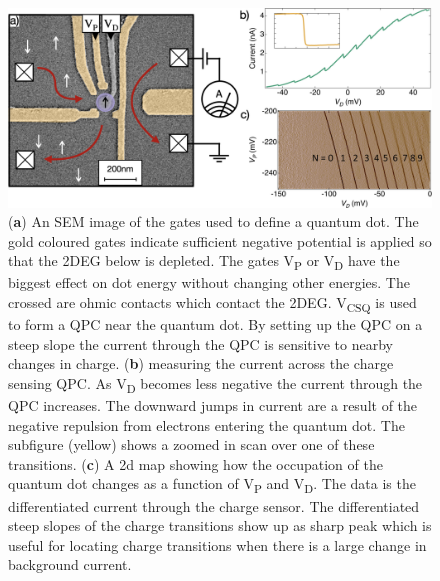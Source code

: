 \begin{figure}[ht]
  \begin{center}
    \includegraphics[width=1.0\textwidth]{figures/ch1/crop_PosterFiguresMaster.004.png}
    \caption[Charge sensing a quantum dot]{\label{fig:ch1/ct_intro} 
    (\textbf{a}) An SEM image of the gates used to define a quantum dot. The gold coloured gates indicate sufficient negative potential is applied so that the 2DEG below is depleted. The gates V\textsubscript{P} or V\textsubscript{D} have the biggest effect on dot energy without changing other energies. The crossed are ohmic contacts which contact the 2DEG. V\textsubscript{CSQ} is used to form a QPC near the quantum dot. By setting up the QPC on a steep slope the current through the QPC is sensitive to nearby changes in charge. (\textbf{b}) measuring the current across the charge sensing QPC. As V\textsubscript{D} becomes less negative the current through the QPC increases. The downward jumps in current are a result of the negative repulsion from electrons entering the quantum dot. The subfigure (yellow) shows a zoomed in scan over one of these transitions. (\textbf{c}) A 2d map showing how the occupation of the quantum dot changes as a function of V\textsubscript{P} and V\textsubscript{D}. The data is the differentiated current through the charge sensor. The differentiated steep slopes of the charge transitions show up as sharp peak which is useful for locating charge transitions when there is a large change in background current. 
      }
  \end{center}
\end{figure}



